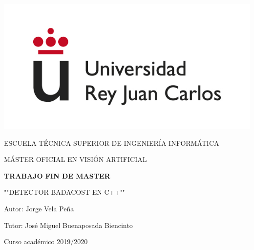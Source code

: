 \begin{titlepage}
	\begin{center}
		\vspace*{3mm}
		\begin{center}
			\includegraphics[width=0.4\linewidth]{imgs/logo.jpg}
		\end{center}
		\vspace{6.5mm}
		
		\fontsize{15.5}{14}\selectfont ESCUELA TÉCNICA SUPERIOR DE INGENIERÍA INFORMÁTICA
		\vspace{8mm}
		
		\fontsize{14}{14}\selectfont MÁSTER OFICIAL EN VISIÓN ARTIFICIAL
		
		\vspace{60pt}
		
		\fontsize{15.7}{14}\selectfont \textbf{TRABAJO FIN DE MASTER} 
		
		\vspace{20mm}
		\begin{huge}
			""DETECTOR BADACOST EN C++""
		\end{huge}
		
		\vspace{20mm}
		
		\begin{large}
			Autor: Jorge Vela Peña
			
			Tutor: José Miguel Buenaposada Biencinto
			
			\vspace{7mm}
		\end{large}
		\begin{normalsize}
			Curso académico 2019/2020		
		\end{normalsize}
		\vspace{7mm}
		
	\end{center}


\end{titlepage}


